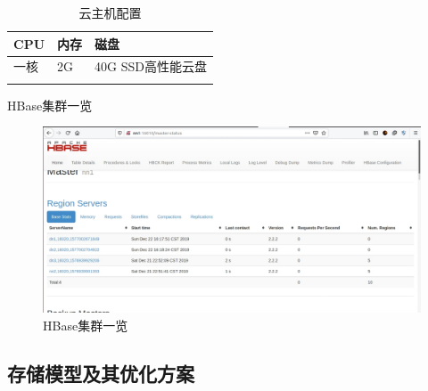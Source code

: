 \documentclass{ctexrep}
\begin{document}
	\begin{longtable}{l|p{5cm}|l}
		\hline
		CPU & 内存 & 磁盘\\
		\hline
		\hline
		一核 &2G & 40G SSD高性能云盘\\
		\hline
		\caption{云主机配置}
	\end{longtable}
	HBase集群一览
	\begin{figure}[H]
		\centering
		\includegraphics[width=0.7\linewidth]{img/HBase_cluster.jpg}
		\caption{HBase集群一览}
		\label{fig:HBase_cluster}
	\end{figure}
	\subsection{存储模型及其优化方案}
\end{document}
